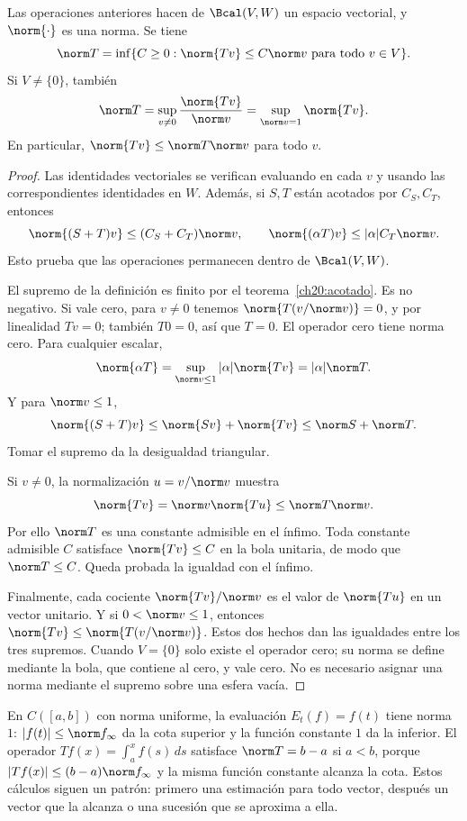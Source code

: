 \begin{proposicion}\label{ch20:norma}
Las operaciones anteriores hacen de $\Bcal(V,W)$ un espacio vectorial, y $\norm{\cdot}$ es una norma. Se tiene
\[
 \norm T=\inf\{C\geq0:\norm{Tv}\leq C\norm v\text{ para todo }v\in V\}.
\]
Si $V\ne\{0\}$, también
\[
 \norm T=\sup_{v\ne0}\frac{\norm{Tv}}{\norm v}
 =\sup_{\norm v=1}\norm{Tv}.
\]
En particular, $\norm{Tv}\leq\norm T\norm v$ para todo $v$.
\end{proposicion}
\begin{proof}
Las identidades vectoriales se verifican evaluando en cada $v$ y usando las correspondientes identidades en $W$. Además, si $S,T$ están acotados por $C_S,C_T$, entonces
\[
 \norm{(S+T)v}\leq(C_S+C_T)\norm v,
 \qquad\norm{(\alpha T)v}\leq|\alpha|C_T\norm v.
\]
Esto prueba que las operaciones permanecen dentro de $\Bcal(V,W)$.

El supremo de la definición es finito por el teorema~\ref{ch20:acotado}. Es no negativo. Si vale cero, para $v\ne0$ tenemos $\norm{T(v/\norm v)}=0$, y por linealidad $Tv=0$; también $T0=0$, así que $T=0$. El operador cero tiene norma cero. Para cualquier escalar,
\[
 \norm{\alpha T}=\sup_{\norm v\leq1}|\alpha|\norm{Tv}=|\alpha|\norm T.
\]
Y para $\norm v\leq1$,
\[
 \norm{(S+T)v}\leq\norm{Sv}+\norm{Tv}\leq\norm S+\norm T.
\]
Tomar el supremo da la desigualdad triangular.

Si $v\ne0$, la normalización $u=v/\norm v$ muestra
\[
 \norm{Tv}=\norm v\norm{Tu}\leq\norm T\norm v.
\]
Por ello $\norm T$ es una constante admisible en el ínfimo. Toda constante admisible $C$ satisface $\norm{Tv}\leq C$ en la bola unitaria, de modo que $\norm T\leq C$. Queda probada la igualdad con el ínfimo.

Finalmente, cada cociente $\norm{Tv}/\norm v$ es el valor de $\norm{Tu}$ en un vector unitario. Y si $0<\norm v\leq1$, entonces $\norm{Tv}\leq\norm{T(v/\norm v)}$. Estos dos hechos dan las igualdades entre los tres supremos. Cuando $V=\{0\}$ solo existe el operador cero; su norma se define mediante la bola, que contiene al cero, y vale cero. No es necesario asignar una norma mediante el supremo sobre una esfera vacía.
\end{proof}

\begin{ejemplo}
En $C([a,b])$ con norma uniforme, la evaluación $E_t(f)=f(t)$ tiene norma $1$: $|f(t)|\leq\norm f_\infty$ da la cota superior y la función constante $1$ da la inferior. El operador $Tf(x)=\int_a^x f(s)\,ds$ satisface $\norm T=b-a$ si $a<b$, porque $|Tf(x)|\leq(b-a)\norm f_\infty$ y la misma función constante alcanza la cota. Estos cálculos siguen un patrón: primero una estimación para todo vector, después un vector que la alcanza o una sucesión que se aproxima a ella.
\end{ejemplo}

